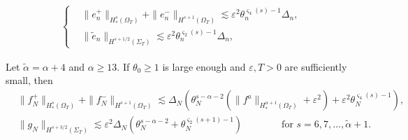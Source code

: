 \documentclass[10pt,a4paper]{amsart}
\begin{document}
	\begin{align} \label{es.sum1a}
		\left\{
		\begin{aligned}
			&	\|e_{n}^+ \|_{H_*^s(\Omega_{T})}+\|e_{n}^- \|_{H^{s+1}(\Omega_{T})}
			\lesssim \varepsilon^2 \theta_n^{\varsigma_4(s)-1}\varDelta_n,\\[1mm]
			&	\|\tilde{e}_n\|_{H^{s+1/2}(\Sigma_T)}
			\lesssim \varepsilon^2 \theta_n^{\varsigma_2(s)-1}\varDelta_n,
		\end{aligned}
		\right.
	\end{align}	

\begin{lemma} \label{lem:source}
	Let $\widetilde{\alpha}={\alpha }+4$ and ${\alpha }\geq 13$.
	If $\theta_0\geq 1$ is large enough and $\varepsilon,T>0$ are sufficiently small, then
	\begin{align}
		&
		\|f_{{N}}^+\|_{H_*^s(\Omega_{T})}+\|f_{{N}}^-\|_{H^{s+1}(\Omega_{T})}
		\lesssim \varDelta_{{N}}\left(\theta_{{N}}^{s-{\alpha }-2} (\|f^a\|_{H_*^{\alpha+1}(\Omega_{T})}
		+\varepsilon^2 )  +\varepsilon^2\theta_{{N}}^{\varsigma_4(s)-1}\right),
		\nonumber \\[0.5mm] %
		&
		\| g_{{N}} \|_{H^{s+3/2}(\Sigma_{T}) }
		\lesssim  \varepsilon^2 \varDelta_{{N}}\left(\theta_{{N}}^{s-{\alpha }-2}
		+\theta_{{N}}^{\varsigma_2(s+1)-1}\right)\nonumber
		\qquad\qquad \textrm{for }s=6,7,\ldots,\widetilde{\alpha}+1.
	\end{align}
\end{lemma}
\end{document}

